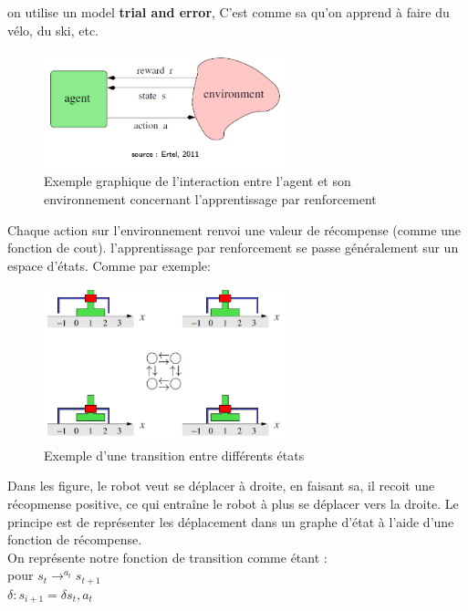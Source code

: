 \documentclass[oneside]{book}
\begin{document}
on utilise un model \textbf{trial and error}, C'est comme sa qu'on apprend à faire du vélo, du ski, etc. \\

\begin{figure}[!ht]
\centering
\includegraphics[width = 7cm]{slide2.png}
\caption{Exemple graphique de l'interaction entre l'agent et son environnement concernant l'apprentissage par renforcement}
\end{figure}

Chaque action sur l'environnement renvoi une valeur de récompense (comme une fonction de cout). l'apprentissage par renforcement se passe généralement sur un espace d'états. Comme par exemple: \\

\begin{figure}[!ht]
\centering
\includegraphics[width = 7cm]{slide3.png}
\caption{Exemple d'une transition entre différents états}
\end{figure}

Dans les figure, le robot veut se déplacer à droite, en faisant sa, il recoit une récopmense positive, ce qui entraîne le robot à plus se déplacer vers la droite. Le principe est de représenter les déplacement dans un graphe d'état à l'aide d'une fonction de récompense.\\

On représente notre fonction de transition comme étant : \\

\centering
pour $s_t \rightarrow^{a_t} s_{t+1}$\\

$\delta : s_{i+1} = \delta{s_t,a_t}$\\
\end{document}
